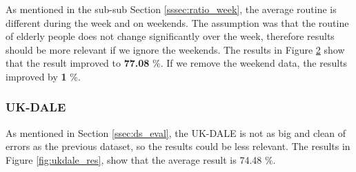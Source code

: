 \begin{figure}[H]
\begin{subfigure}{.5\textwidth}
        \label{fig:refit_res_nw_1}
    \end{subfigure}
\end{figure}

As mentioned in the sub-sub Section \ref{sssec:ratio_week}, the average routine is different during the week and on weekends.
The assumption was that the routine of elderly people does not change significantly over the week, therefore results should be more relevant if we ignore the weekends.
The results in Figure \ref{fig:refit_res_nw_1} show that the result improved to \textbf{77.08} \%.
If we remove the weekend data, the results improved by \textbf{1} \%. 

\subsubsection{UK-DALE}

As mentioned in Section \ref{ssec:ds_eval}, the UK-DALE is not as big and clean of errors as the previous dataset, so the results could be less relevant.
The results in Figure \ref{fig:ukdale_res}, show that the average result is 74.48 \%. 

